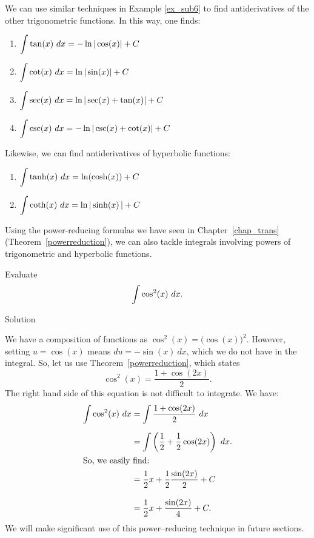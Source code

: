We can use similar techniques in Example \ref{ex_sub6} to find antiderivatives of the other trigonometric functions. In this way, one finds: 
	\begin{enumerate}
		\item	$\displaystyle \int \tan(x)\ dx = -\ln|\cos(x)|+C$
	\item		$\displaystyle \int \cot(x)\ dx = \ln|\sin(x)|+C$
		\item		$\displaystyle\int \sec(x)\ dx = \ln|\sec(x)+\tan(x)| + C$
	\item		$\displaystyle \int \csc(x) \ dx = -\ln|\csc(x)+\cot(x)| +C$
\end{enumerate}

\ifanalysis

Likewise, we can find antiderivatives of hyperbolic functions:
\begin{enumerate}
\item $\displaystyle\int \tanh(x)\ dx = \ln(\cosh(x)) +C$
\item $\displaystyle\int \coth(x)\ dx = \ln|\sinh(x)\,|+C$
\end{enumerate}

\fi


		
		
Using the power-reducing formulas we have seen in Chapter~\ref{chap_trans} (Theorem~\ref{powerreduction}), we can also tackle integrals involving powers of trigonometric \ifanalysis and hyperbolic \fi functions. 

\begin{example}\label{ex_sub8}
Evaluate $$\displaystyle \int \cos^2(x)\ dx.$$

Solution 

We have a composition of functions as $\cos^2(x) = \big(\cos(x)\big)^2$. 
However, setting $u = \cos(x)$ means $du = -\sin (x)\ dx$, which we do not have in the integral. So, let us use Theorem~\ref{powerreduction}, which states 
	$$\cos^2(x) = \frac{1+\cos(2x)}{2}.$$
	The right hand side of this equation is not difficult to integrate. We have:
\begin{align*}
	\int \cos^2(x)\ dx &= \int \frac{1+\cos(2x)}2\ dx \\[0.2cm]
									&=	\int \left( \frac12 + \frac12\cos(2x)\right)\ dx. \\
\intertext{So, we easily find:}
									&= \frac12x + \frac12\frac{\sin(2x)}{2} + C \rule[-10pt]{0pt}{5pt}\\[0.2cm]
									&= \frac12x + \frac{\sin(2x)}4 + C.
\end{align*}
We will make significant use of this power--reducing technique in future sections.
\end{example}

